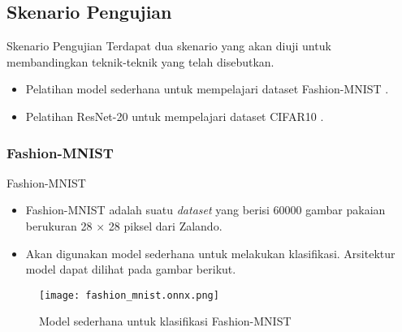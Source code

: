 \subsection{Skenario Pengujian}
\begin{frame}{Skenario Pengujian}
  Terdapat dua skenario yang akan diuji untuk membandingkan teknik-teknik yang telah disebutkan.
  \begin{itemize}
    \item Pelatihan model sederhana untuk mempelajari dataset Fashion-MNIST \parencite{xiao2017fashion}.
    \item Pelatihan ResNet-20 untuk mempelajari dataset CIFAR10 \parencite{krizhevsky2009cifar}.
  \end{itemize}
\end{frame}

\subsubsection{Fashion-MNIST}
\begin{frame}{Fashion-MNIST}
  \begin{itemize}
    \item Fashion-MNIST \parencite{xiao2017fashion} adalah suatu \textit{dataset} yang berisi 60000 gambar pakaian berukuran 28 $\times$ 28 piksel dari Zalando.

    \item Akan digunakan model sederhana untuk melakukan klasifikasi. Arsitektur model dapat dilihat pada gambar berikut.
  \end{itemize}
  \begin{figure}
    \texttt{[image: fashion\_mnist.onnx.png]}
    \caption{Model sederhana untuk klasifikasi Fashion-MNIST}\label{modelfashion}
  \end{figure}
\end{frame}

